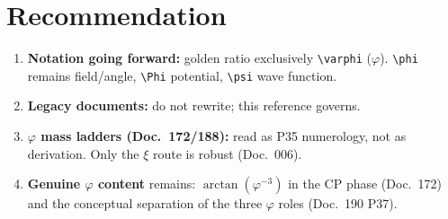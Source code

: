 \section{Recommendation}

\begin{enumerate}
  \item \textbf{Notation going forward:} golden ratio exclusively
        \verb|\varphi| ($\varphi$). \verb|\phi| remains field/angle,
        \verb|\Phi| potential, \verb|\psi| wave function.
  \item \textbf{Legacy documents:} do not rewrite; this reference governs.
  \item \textbf{$\varphi$ mass ladders (Doc.~172/188):} read as P35 numerology,
        not as derivation. Only the $\xi$ route is robust (Doc.~006).
  \item \textbf{Genuine $\varphi$ content} remains: $\arctan(\varphi^{-3})$ in
        the CP phase (Doc.~172) and the conceptual separation of the three
        $\varphi$ roles (Doc.~190 P37).
\end{enumerate}
